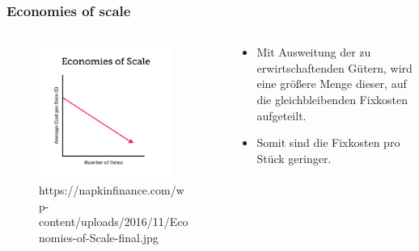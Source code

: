 \documentclass{beamer}
\begin{document}
\begin{frame}
\frametitle{Economies of scale}

\begin{columns}
    \begin{column}{0.5\textwidth}
  \begin{figure}[h]
    \centering
      \includegraphics[width=0.9\textwidth]{economies_of_scale}
      \caption{https://napkinfinance.com/wp-content/uploads/2016/11/Economies-of-Scale-final.jpg}
  \end{figure}
    \end{column}
    \begin{column}{0.5\textwidth}
    \begin{itemize}
    \item
  Mit Ausweitung der zu
  erwirtschaftenden Gütern,
  wird eine größere Menge
  dieser, auf die
  gleichbleibenden Fixkosten
  aufgeteilt.
\item
  Somit sind die Fixkosten pro
  Stück geringer.

    \end{itemize}
    \end{column}
\end{columns}
\end{frame}


\end{document}
